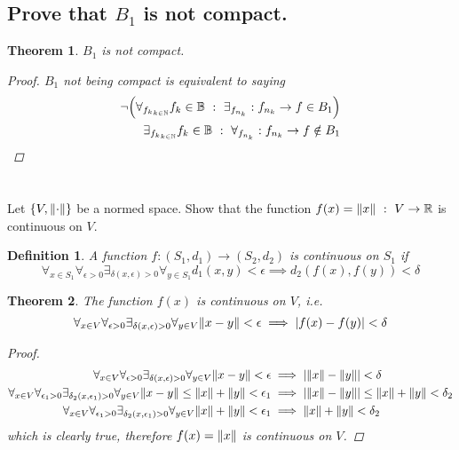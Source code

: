 \documentclass[]{article}
\newcommand{\R}{\mathbb{R}}
\newcommand{\N}{\mathbb{N}}
\newcommand{\st}{\ : \ }
\newtheorem{definition}{Definition}
\newtheorem{theorem}{Theorem}
\begin{document}
\subsection{Prove that $B_1$ is not compact.}

\begin{theorem}
    $B_1$ is not compact.
    \begin{proof}
        $B_1$ not being compact is equivalent to saying
        \begin{align*}
            \lnot \qty(\forall_{{f_k}_{k\in \N}} f_k \in \mathbb{B} \st \exists_{{f_{n_k}}} : f_{n_k} \to f \in B_1)\\
            \exists_{{f_k}_{k\in \N}} f_k \in \mathbb{B} \st \forall_{{f_{n_k}}} : f_{n_k} \to f \notin B_1
        \end{align*}
    \end{proof}
\end{theorem}



\newpage
\section{}
Let $\{V, \norm{\cdot}\}$ be a normed space.
Show that the function $f(x) = \norm{x} \st V \to \R$ is continuous on $V$.

\begin{definition}
    A function $f : (S_1,d_1) \to (S_2,d_2)$ is continuous on $S_1$ if 
    \[
        \forall_{x\in S_1} \forall_{\epsilon>0} \exists_{\delta(x,\epsilon)>0} \forall_{y\in S_1} d_1(x,y) < \epsilon \implies d_2(f(x),f(y)) < \delta
    \]
\end{definition}

\begin{theorem}
    The function $f(x)$ is continuous on $V$, i.e.
    \[
        \forall_{x\in V} \forall_{\epsilon>0} \exists_{\delta(x,\epsilon)>0} \forall_{y\in V} \norm{x - y} < \epsilon \implies \abs{f(x) - f(y)} < \delta
    \]
    \begin{proof}
        \begin{align*}
            \forall_{x\in V} \forall_{\epsilon>0} \exists_{\delta(x,\epsilon)>0} \forall_{y\in V} \norm{x - y} < \epsilon 
                &\implies \abs{\norm{x} - \norm{y}} < \delta\\
            \forall_{x\in V} \forall_{\epsilon_1>0} \exists_{\delta_2(x,\epsilon_1)>0} \forall_{y\in V} \norm{x - y} \leq \norm{x} + \norm{y} < \epsilon_1 
                &\implies \abs{\norm{x} - \norm{y}}\leq \norm{x} + \norm{y} < \delta_2\\
            \forall_{x\in V} \forall_{\epsilon_1>0} \exists_{\delta_2(x,\epsilon_1)>0} \forall_{y\in V} \norm{x} + \norm{y} < \epsilon_1 
                &\implies \norm{x} + \norm{y} < \delta_2\\
        \end{align*}
        which is clearly true, therefore $f(x) = \norm{x}$ is continuous on $V$.
    \end{proof}
\end{theorem}
\end{document}

